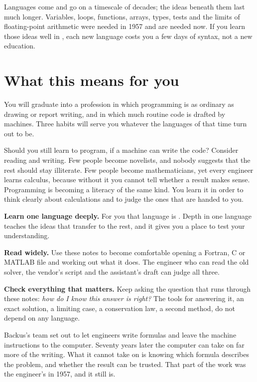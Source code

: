 \begin{keyidea}
Languages come and go on a timescale of decades; the ideas beneath them last much
longer. Variables, loops, functions, arrays, types, tests and the limits of
floating-point arithmetic were needed in 1957 and are needed now. If you learn those
ideas well in \py, each new language costs you a few days of syntax, not a new
education.
\end{keyidea}

\section*{What this means for you}

You will graduate into a profession in which programming is as ordinary as drawing or
report writing, and in which much routine code is drafted by machines. Three habits will
serve you whatever the languages of that time turn out to be.

Should you still learn to program, if a machine can write the code? Consider reading and
writing. Few people become novelists, and nobody suggests that the rest should stay
illiterate. Few people become mathematicians, yet every engineer learns calculus,
because without it you cannot tell whether a result makes sense. Programming is becoming
a literacy of the same kind. You learn it in order to think clearly about calculations
and to judge the ones that are handed to you.

\textbf{Learn one language deeply.} For you that language is \py. Depth in one language
teaches the ideas that transfer to the rest, and it gives you a place to test your
understanding.

\textbf{Read widely.} Use these notes to become comfortable opening a Fortran, C or
MATLAB file and working out what it does. The engineer who can read the old solver, the
vendor's script and the assistant's draft can judge all three.

\textbf{Check everything that matters.} Keep asking the question that runs through these
notes: \emph{how do I know this answer is right?} The tools for answering it, an exact
solution, a limiting case, a conservation law, a second method, do not depend on any
language.

Backus's team set out to let engineers write formulas and leave the machine instructions
to the computer. Seventy years later the computer can take on far more of the writing.
What it cannot take on is knowing which formula describes the problem, and whether the
result can be trusted. That part of the work was the engineer's in 1957, and it still is.

